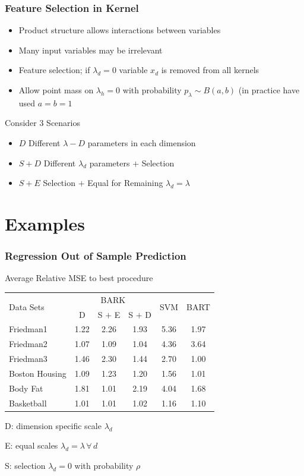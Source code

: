 \documentclass[handout]{beamer}
\newcommand{\bs}[2]{\begin{frame} \frametitle{#1}
{#2}
\end{frame} }
\begin{document}
\bs{Feature Selection in Kernel} {
\begin{itemize}
\item Product structure allows interactions between variables  \pause
\item Many input variables may be irrelevant \pause
\item Feature selection; if $\lambda_d = 0$ variable $x_d$ is removed
  from all kernels \pause
\item Allow point mass on $\lambda_h = 0$ with probability $p_\lambda
  \sim B(a,b)$  (in practice have used $a = b = 1$ \pause
\end{itemize}

Consider 3 Scenarios

\begin{itemize}
\item $D$ Different $\lambda-D$ parameters in each dimension \pause
\item $S + D$ Different $\lambda_d$ parameters $+$ Selection \pause
\item $S + E$ Selection $+$ Equal for Remaining $\lambda_d = \lambda$
\end{itemize}

}

\section{Examples}

\bs{Regression Out of Sample Prediction} {
Average Relative MSE to best procedure
\small{
  \begin{tabular}[ht]{|l|c|c|c|c|c|}
    \hline
  \multirow{2}{*}{Data Sets} &
  \multicolumn{3}{c|}{BARK} &
  \multirow{2}{*}{SVM}&
  \multirow{2}{*}{BART} \\
  \cline{2-4}
  &  D
  & S $+$ E & S $+$ D && \\
    \hline
  Friedman1       %
  & 1.22 & 2.26 & 1.93 & 5.36 & 1.97 \\
  Friedman2       %
  & 1.07 & 1.09 & 1.04 & 4.36 & 3.64 \\
  Friedman3       %
  & 1.46 & 2.30 & 1.44 & 2.70 & 1.00 \\
  Boston Housing  %
  & 1.09 & 1.23 & 1.20 & 1.56 & 1.01 \\
  Body Fat        %
  & 1.81 & 1.01 & 2.19 & 4.04 & 1.68 \\
  Basketball      %
  & 1.01 & 1.01 & 1.02 & 1.16 & 1.10 \\\hline
  \end{tabular}
}

D: dimension specific scale $\lambda_d$

E: equal scales $\lambda_d = \lambda \, \forall \, d$

S: selection $\lambda_d = 0$ with probability $\rho$

}
\end{document}
